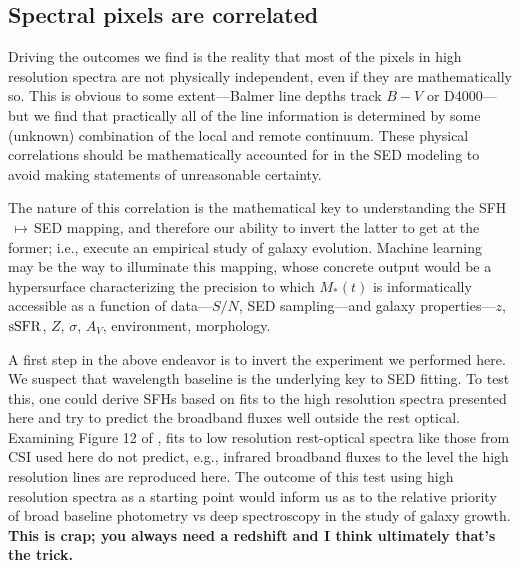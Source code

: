 \documentclass[a4paper,fleqn,usenatbib]{mnras}
\newcommand{\Mstel}{M_\ast}
\newcommand{\bfr}{\bf\color{red}}
\newcommand{\ssfr}{{\rm sSFR}}
\begin{document}
\subsection{Spectral pixels are correlated}
\label{sec:pixels}

Driving the outcomes we find is the reality that most of the pixels in high resolution 
spectra are not physically independent, even if they are mathematically so. This is obvious to 
some extent---Balmer line depths track $B-V$ or D4000---but we find that practically all of the 
line information is determined by some (unknown) combination of the local and remote 
continuum. These physical correlations should be mathematically accounted for in the SED 
modeling to avoid making statements of unreasonable certainty.

The nature of this correlation is the mathematical key to understanding the SFH$\,\mapsto\,$SED 
mapping, and therefore our ability to invert the latter to get at the former; i.e., execute an empirical 
study of galaxy evolution. Machine learning may be the way to illuminate this mapping, whose concrete 
output would be a hypersurface characterizing the precision to which $\Mstel(t)$ is informatically 
accessible as a function of data---$S/N$, SED sampling---and galaxy properties---$z$, $\ssfr$, $Z$, 
$\sigma$, $A_{V}$, environment, morphology. 

A first step in the above endeavor is to invert the experiment we performed here. We suspect 
that wavelength baseline is the underlying key to SED fitting. To test this, one could derive
SFHs based on fits to the high resolution spectra presented here and try to predict the broadband
fluxes well outside the rest optical. Examining Figure 12 of \citet{Abramson20}, fits to
low resolution rest-optical spectra like those from CSI used here do not predict, e.g., infrared
broadband fluxes to the level the high resolution lines are reproduced here. The outcome of
this test using high resolution spectra as a starting point would inform us as to the relative
priority of broad baseline photometry vs deep spectroscopy in the study of galaxy growth. 
{\bfr This is crap; you always need a redshift and I think ultimately that's the trick.}
\end{document}
